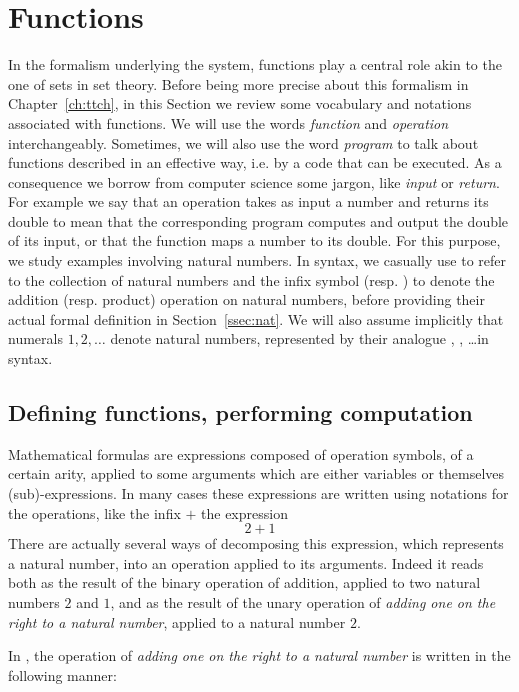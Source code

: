 \section{Functions}\label{sec:functions}
In the formalism underlying the \Coq{} system, functions play a
central role akin to the one of sets in set theory. Before being more
precise about this formalism in Chapter~\ref{ch:ttch}, in this Section
we review some vocabulary and notations associated with functions.
We will use the words \emph{function} and \emph{operation}
interchangeably. Sometimes, we will also use the word \emph{program}
to talk about functions described in an effective way, i.e. by a code
that can be executed. As a consequence we borrow from computer science
some jargon, like \emph{input} or \emph{return}. For example we say that
an operation takes as input a number and returns its double to mean
that the corresponding program computes and output the double of its
input, or that the function maps a number to its double. For
this purpose, we study examples involving natural numbers. In \Coq{}
syntax, we casually use  to refer to the collection of natural
numbers and the infix symbol  \C{+} (resp. \C{*}) to denote the  addition
(resp. product) operation on natural numbers,  before providing their
actual formal definition in Section~\ref{ssec:nat}. We will also
assume implicitly that numerals $1, 2, \dots$ denote natural numbers,
represented by their analogue , , \dots in \Coq{} syntax.


\subsection{Defining functions, performing computation}\label{ssec:deffun}
Mathematical formulas are expressions composed of operation symbols,
of a certain arity, applied to some arguments which are
either variables or themselves (sub)-expressions.
In many cases these
expressions are written using notations for the operations, like the
infix $+$ the expression
\[ 2 + 1 \]
There are actually several ways of decomposing this expression, which
represents a natural number, into an operation applied to its arguments.
Indeed it reads both as  the result of the binary operation
of addition, applied to two natural numbers $2$ and $1$, and as the
result of the unary operation of {\em adding one on the right to a
  natural number}, applied to a natural number $2$.

In \Coq{}, the operation of {\em adding one on the right to a natural number} is
written in the following manner:

